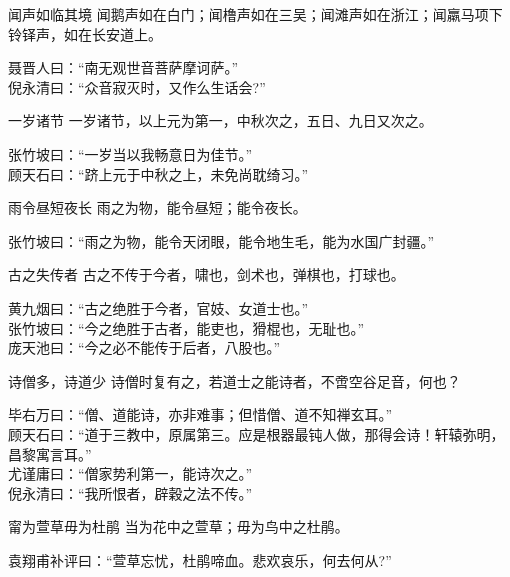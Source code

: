 \begin{yulu}{闻声如临其境}
闻鹅声如在白门；闻橹声如在三吴；闻滩声如在浙江；闻羸马项下铃铎声，如在长安道上。
\begin{comments}
聂晋人曰：“南无观世音菩萨摩诃萨。” \\
倪永清曰：“众音寂灭时，又作么生话会?”
\end{comments}
\end{yulu}

\begin{yulu}{一岁诸节}
一岁诸节，以上元为第一，中秋次之，五日、九日又次之。
\begin{comments}
张竹坡曰：“一岁当以我畅意日为佳节。” \\
顾天石曰：“跻上元于中秋之上，未免尚耽绮习。”
\end{comments}
\end{yulu}

\begin{yulu}{雨令昼短夜长}
雨之为物，能令昼短；能令夜长。
\begin{comments}
张竹坡曰：“雨之为物，能令天闭眼，能令地生毛，能为水国广封疆。”
\end{comments}
\end{yulu}

\begin{yulu}{古之失传者}
古之不传于今者，啸也，剑术也，弹棋也，打球也。
\begin{comments}
黄九烟曰：“古之绝胜于今者，官妓、女道士也。” \\
张竹坡曰：“今之绝胜于古者，能吏也，猾棍也，无耻也。” \\
庞天池曰：“今之必不能传于后者，八股也。”
\end{comments}
\end{yulu}

\begin{yulu}{诗僧多，诗道少}
诗僧时复有之，若道士之能诗者，不啻空谷足音，何也？
\begin{comments}
毕右万曰：“僧、道能诗，亦非难事；但惜僧、道不知禅玄耳。” \\
顾天石曰：“道于三教中，原属第三。应是根器最钝人做，那得会诗！轩辕弥明，昌黎寓言耳。” \\
尤谨庸曰：“僧家势利第一，能诗次之。” \\
倪永清曰：“我所恨者，辟穀之法不传。”
\end{comments}
\end{yulu}

\begin{yulu}{甯为萱草毋为杜鹃}
当为花中之萱草；毋为鸟中之杜鹃。
\begin{comments}
袁翔甫补评曰：“萱草忘忧，杜鹃啼血。悲欢哀乐，何去何从?”
\end{comments}
\end{yulu}

